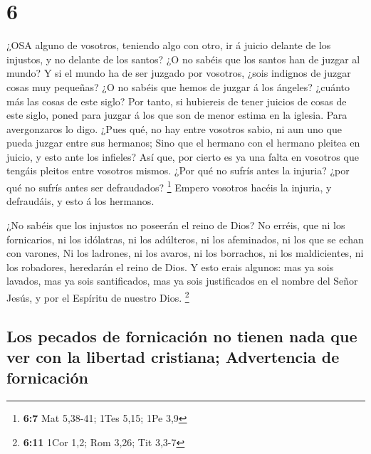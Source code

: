 \hypertarget{section-5}{%
\section{6}\label{section-5}}

 ¿OSA alguno de vosotros, teniendo algo con otro, ir á
juicio delante de los injustos, y no delante de los santos? 
¿O no sabéis que los santos han de juzgar al mundo? Y si el mundo ha de
ser juzgado por vosotros, ¿sois indignos de juzgar cosas muy pequeñas?
 ¿O no sabéis que hemos de juzgar á los ángeles? ¿cuánto más
las cosas de este siglo?  Por tanto, si hubiereis de tener
juicios de cosas de este siglo, poned para juzgar á los que son de menor
estima en la iglesia.  Para avergonzaros lo digo. ¿Pues qué,
no hay entre vosotros sabio, ni aun uno que pueda juzgar entre sus
hermanos;  Sino que el hermano con el hermano pleitea en
juicio, y esto ante los infieles?  Así que, por cierto es ya
una falta en vosotros que tengáis pleitos entre vosotros mismos. ¿Por
qué no sufrís antes la injuria? ¿por qué no sufrís antes ser
defraudados? \footnote{\textbf{6:7} Mat 5,38-41; 1Tes 5,15; 1Pe 3,9}
 Empero vosotros hacéis la injuria, y defraudáis, y esto á
los hermanos.

 ¿No sabéis que los injustos no poseerán el reino de Dios?
No erréis, que ni los fornicarios, ni los idólatras, ni los adúlteros,
ni los afeminados, ni los que se echan con varones,  Ni los
ladrones, ni los avaros, ni los borrachos, ni los maldicientes, ni los
robadores, heredarán el reino de Dios.  Y esto erais
algunos: mas ya sois lavados, mas ya sois santificados, mas ya sois
justificados en el nombre del Señor Jesús, y por el Espíritu de nuestro
Dios. \footnote{\textbf{6:11} 1Cor 1,2; Rom 3,26; Tit 3,3-7}

\hypertarget{los-pecados-de-fornicaciuxf3n-no-tienen-nada-que-ver-con-la-libertad-cristiana-advertencia-de-fornicaciuxf3n}{%
\subsection{Los pecados de fornicación no tienen nada que ver con la
libertad cristiana; Advertencia de
fornicación}\label{los-pecados-de-fornicaciuxf3n-no-tienen-nada-que-ver-con-la-libertad-cristiana-advertencia-de-fornicaciuxf3n}}

